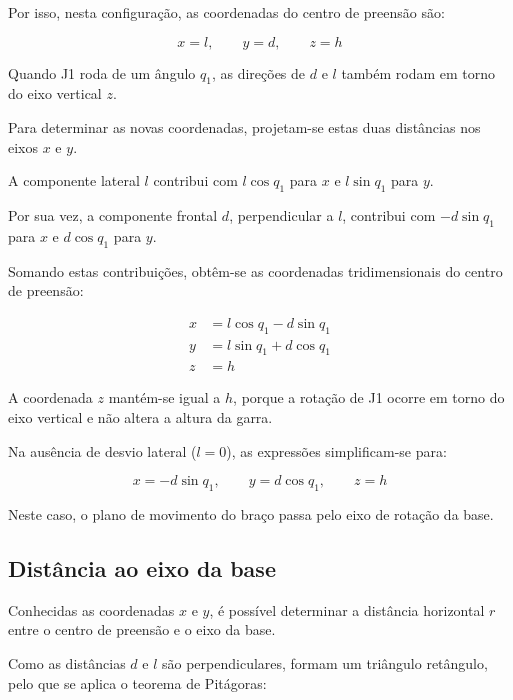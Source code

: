 Por isso, nesta configuração, as coordenadas do centro de preensão são:

\begin{equation}
    x=l,\qquad y=d,\qquad z=h
\end{equation}

Quando J1 roda de um ângulo $q_1$, as direções de $d$ e $l$ também rodam em torno do eixo vertical $z$.

Para determinar as novas coordenadas, projetam-se estas duas distâncias nos eixos $x$ e $y$.

A componente lateral $l$ contribui com $l\cos q_1$ para $x$ e $l\sin q_1$ para $y$.

Por sua vez, a componente frontal $d$, perpendicular a $l$, contribui com $-d\sin q_1$ para $x$ e $d\cos q_1$ para $y$.

Somando estas contribuições, obtêm-se as coordenadas tridimensionais do centro de preensão:

\begin{equation}
    \boxed{
    \begin{aligned}
        x &= l\cos q_1-d\sin q_1\\
        y &= l\sin q_1+d\cos q_1\\
        z &= h
    \end{aligned}
    }
    \label{eq:xyz}
\end{equation}

A coordenada $z$ mantém-se igual a $h$, porque a rotação de J1 ocorre em torno do eixo vertical e não altera a altura da garra.

Na ausência de desvio lateral ($l=0$), as expressões simplificam-se para:

\begin{equation}
    x=-d\sin q_1,\qquad
    y=d\cos q_1,\qquad
    z=h
\end{equation}

Neste caso, o plano de movimento do braço passa pelo eixo de rotação da base.

\subsection{Distância ao eixo da base}

Conhecidas as coordenadas $x$ e $y$, é possível determinar a distância horizontal $r$ entre o centro de preensão e o eixo da base.

Como as distâncias $d$ e $l$ são perpendiculares, formam um triângulo retângulo, pelo que se aplica o teorema de Pitágoras:

